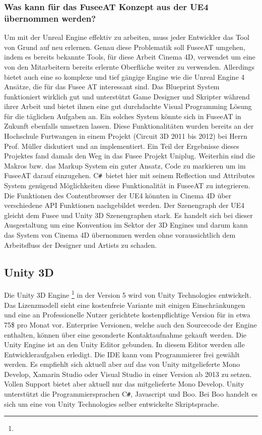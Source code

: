 \documentclass[pagesize, paper=a4, fontsize=12pt, titlepage=true, headings=small, headnosepline, abstractoff, liststotoc, nochapterprefix, plainheadsepline, twoside]{scrreprt}
\newcommand{\CS}{C\texttt{\#}}
\newcommand{\CSS}{C\texttt{\# }}
\begin{document}
\subsubsection{Was kann für das FuseeAT Konzept aus der UE4 übernommen werden?}
Um mit der Unreal Engine effektiv zu arbeiten, muss jeder Entwickler das Tool von Grund auf neu erlernen. Genau diese Problematik soll FuseeAT umgehen, indem es bereits bekannte Tools, für diese Arbeit Cinema 4D, verwendet um eine von den Mitarbeitern bereits erlernte Oberfläche weiter zu verwenden. Allerdings bietet auch eine so komplexe und tief gängige Engine wie die Unreal Engine 4 Ansätze, die für das Fusee AT interessant sind. Das Blueprint System funktioniert wirklich gut und unterstützt Game Designer und Skripter während ihrer Arbeit und bietet ihnen eine gut durchdachte Visual Programming Lösung für die täglichen Aufgaben an. Ein solches System könnte sich in FuseeAT in Zukunft ebenfalls umsetzen lassen. Diese Funktionalitäten wurden bereits an der Hochschule Furtwangen in einem Projekt (Circuit 3D 2011 bis 2012) bei Herrn Prof. Müller diskutiert und an implementiert. Ein Teil der Ergebnisse dieses Projektes fand damals den Weg in das Fusee Projekt Uniplug.
Weiterhin sind die Makros bzw. das Markup System ein guter Ansatz, Code zu markieren um im FuseeAT darauf einzugehen. \CSS bietet hier mit seinem Reflection und Attributes System genügend Möglichkeiten diese Funktionalität in FuseeAT zu integrieren. Die Funktionen des Contentbrowser der UE4 könnten in Cinema 4D über verschiedene API Funktionen nachgebildet werden. Der Szenengraph der UE4 gleicht dem Fusee und Unity 3D Szenengraphen stark. Es handelt sich bei dieser Ausgestaltung um eine Konvention im Sektor der 3D Engines und darum kann das System von Cinema 4D übernommen werden ohne voraussichtlich dem Arbeitsfluss der Designer und Artists zu schaden.

\subsection{Unity 3D}
Die Unity 3D Engine \footnote{} in der Version 5 wird von Unity Technologies entwickelt. Das Lizenzmodell sieht eine kostenfreie Variante mit einigen Einschränkungen und eine an Professionelle Nutzer gerichtete kostenpflichtige Version für in etwa 75\$ pro Monat vor. Enterprise Versionen, welche auch den Sourcecode der Engine enthalten, können über eine gesonderte Kontaktaufnahme gekauft werden. Die Unity Engine ist an den Unity Editor gebunden. In diesem Editor werden alle Entwickleraufgaben erledigt. Die IDE kann vom Programmierer frei gewählt werden. Es empfiehlt sich aktuell aber auf das von Unity mitgelieferte Mono Develop, Xamarin Studio oder Visual Studio in einer Version ab 2013 zu setzen. Vollen Support bietet aber aktuell nur das mitgelieferte Mono Develop. Unity unterstützt die Programmiersprachen \CS, Javascript und Boo. Bei Boo handelt es sich um eine von Unity Technologies selber entwickelte Skriptsprache.
\end{document}
